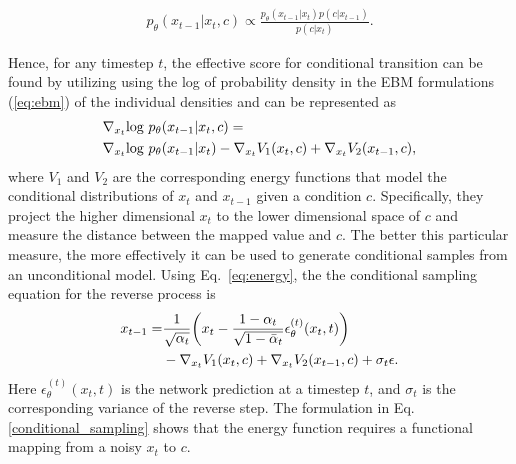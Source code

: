 \documentclass[10pt,twocolumn,letterpaper]{article}
\begin{document}
\begin{align}
    \label{eq:diffeq}
   p_{\theta}(x_{t-1}|x_{t},c)\propto \frac{p_{\theta}(x_{t-1}|x_{t})
   p(c|x_{t-1})}{p(c|x_{t})}.
\end{align}

 Hence, for any timestep $t$, the effective score for conditional transition can be found by utilizing using the log of probability density in the EBM formulations (\ref{eq:ebm}) of the individual densities and can be represented as
\begin{align}
   &\nabla_{x_t} \text{log }p_{\theta}(x_{t-1}|x_{t},c) = \notag\\
   &\nabla_{x_t} \text{log }p_{\theta}(x_{t-1}|x_{t})-\nabla_{x_t} V_1(x_t,c)+\nabla_{x_t} V_2(x_{t-1},c),
   \label{eq:energy}
\end{align}
 where $V_1$ and $V_2$ are the corresponding energy functions that model the conditional distributions of $x_t$ and $x_{t-1}$ given a condition $c$. Specifically, they project the higher dimensional $x_t$ to the lower dimensional space of $c$ and measure the distance between the mapped value and $c$. The better this particular measure, the more effectively it can be used to generate conditional samples from an unconditional model. Using Eq.~\eqref{eq:energy}, the the conditional sampling equation for the reverse process is
\begin{align}\label{conditional_sampling}
x_{t-1} = & \frac{1}{\sqrt{\alpha_t}}\bigg( x_t - \frac{1-\alpha_t}{\sqrt{1-\bar\alpha_t}} \epsilon^{(t)}_\theta(x_t, t) \bigg)\notag\\
&-\nabla_{x_t} V_1(x_t,c)+\nabla_{x_t} {V_2}(x_{t-1},c)+ \sigma_t \epsilon.
\end{align}
Here $\epsilon^{(t)}_\theta(x_t, t)$ is the network prediction at a timestep $t$, and $\sigma_t$ is the corresponding variance of the reverse step. The formulation in Eq. \eqref{conditional_sampling} shows that the energy function requires a functional mapping from a noisy $x_t$ to $c$.
\end{document}
